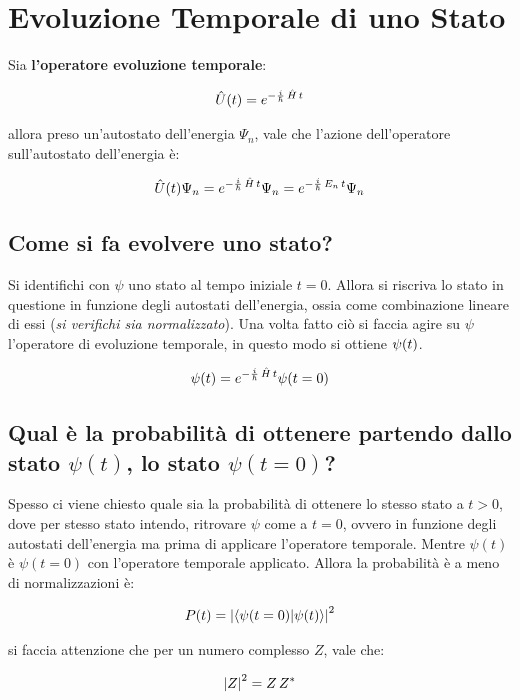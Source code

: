 


\section{Evoluzione Temporale di uno Stato}

	Sia \textbf{l'operatore evoluzione temporale}:
	
\begin{align*}
	\hat{U}\qty(t) = e^{-\frac{i}{\hbar} \, \hat{H}\, t}
\end{align*}

	allora preso un'autostato dell'energia $\Psi_n$, vale che l'azione dell'operatore sull'autostato dell'energia è:
	
\begin{align*}
	\hat{U}\qty(t) \Psi_n = e^{-\frac{i}{\hbar} \, \hat{H}\, t} \Psi_n = e^{-\frac{i}{\hbar} \, E_n \, t} \Psi_n
\end{align*}

\subsection{Come si fa evolvere uno stato?}

	Si identifichi con $\psi$ uno stato al tempo iniziale $t = 0$. Allora si riscriva lo stato in questione in funzione degli autostati dell'energia, ossia come combinazione lineare di essi (\textit{si verifichi sia normalizzato}). Una volta fatto ciò si faccia agire su $\psi$ l'operatore di evoluzione temporale, in questo modo si ottiene $\psi\qty(t)$.
	
\begin{align*}
	\psi\qty(t) =  e^{-\frac{i}{\hbar} \, \hat{H}\, t} \psi\qty(t = 0) 
\end{align*}

\subsection{Qual è la probabilità di ottenere partendo dallo stato $\psi(t)$, lo stato $\psi(t = 0)$?}

	Spesso ci viene chiesto quale sia la probabilità di ottenere lo stesso stato a $t > 0$, dove per stesso stato intendo, ritrovare $\psi$ come a $t = 0$, ovvero in funzione degli autostati dell'energia ma prima di applicare l'operatore temporale. Mentre $\psi(t)$ è $\psi(t = 0)$ con l'operatore temporale applicato. Allora la probabilità è a meno di normalizzazioni è:
	
\begin{align*}
	P\qty(t) = \qty|\braket{\psi\qty(t = 0)}{\psi\qty(t)}|^2
\end{align*}

	si faccia attenzione che per un numero complesso $Z$, vale che:
	
\begin{align*}
	\qty|Z|^2 = Z \, Z^*
\end{align*}


	


